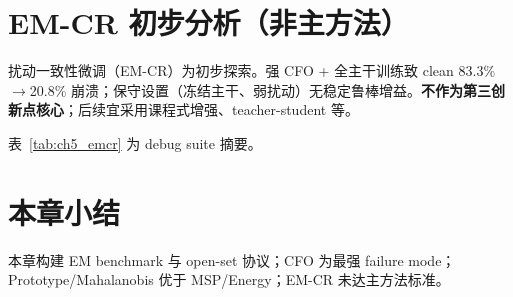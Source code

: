 \section{EM-CR 初步分析（非主方法）}

扰动一致性微调（EM-CR）为初步探索。强 CFO + 全主干训练致 clean 83.3\%$\rightarrow$20.8\% 崩溃；保守设置（冻结主干、弱扰动）无稳定鲁棒增益。\textbf{不作为第三创新点核心}；后续宜采用课程式增强、teacher-student 等。

表~\ref{tab:ch5_emcr} 为 debug suite 摘要。



\section{本章小结}

本章构建 EM benchmark 与 open-set 协议；CFO 为最强 failure mode；Prototype/Mahalanobis 优于 MSP/Energy；EM-CR 未达主方法标准。
